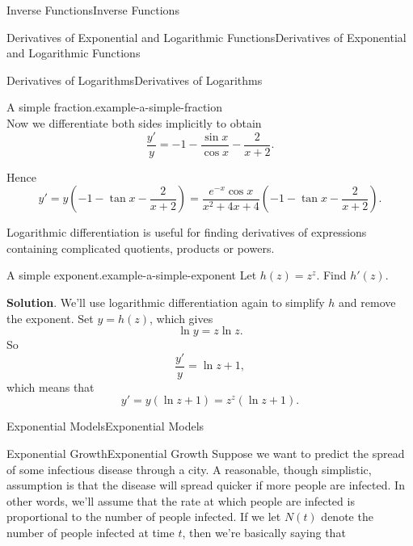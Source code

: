 \documentclass[10pt,]{book}
\numberwithin{equation}{section}
\begin{document}
\begin{chapterptx}{Inverse Functions}{}{Inverse Functions}{}{}
\begin{sectionptx}{Derivatives of Exponential and Logarithmic Functions}{}{Derivatives of Exponential and Logarithmic Functions}{}{}
\begin{subsectionptx}{Derivatives of Logarithms}{}{Derivatives of Logarithms}{}{}
\begin{example}{A simple fraction.}{example-a-simple-fraction}
\begin{equation*}
\end{equation*}
Now we differentiate both sides implicitly to obtain%
\begin{equation*}
\frac{y'}{y} = -1 - \frac{\sin x}{\cos x} - \frac{2}{x+2}.
\end{equation*}
%
\par
\hypertarget{p-242}{}%
Hence%
\begin{equation*}
y' = y\left(-1 - \tan x - \frac{2}{x+2}\right) = \frac{e^{-x}\cos x}{x^{2} + 4x + 4}\left(-1 - \tan x - \frac{2}{x+2}\right).
\end{equation*}
%
\end{example}
\hypertarget{p-243}{}%
Logarithmic differentiation is useful for finding derivatives of expressions containing complicated quotients, products or powers.%
\begin{example}{A simple exponent.}{example-a-simple-exponent}%
\hypertarget{p-244}{}%
Let \(h(z) = z^{z}\). Find \(h'(z)\).%
\par\smallskip%
\noindent\textbf{Solution}.\hypertarget{solution-53}{}\quad%
\hypertarget{p-245}{}%
We'll use logarithmic differentiation again to simplify \(h\) and remove the exponent. Set \(y = h(z)\), which gives%
\begin{equation*}
\ln y = z\ln z.
\end{equation*}
So%
\begin{equation*}
\frac{y'}{y} = \ln z + 1,
\end{equation*}
which means that%
\begin{equation*}
y' = y(\ln z + 1) = z^{z}(\ln z + 1).
\end{equation*}
%
\end{example}
\end{subsectionptx}
\end{sectionptx}
%
%
\typeout{************************************************}
\typeout{************************************************}
%
\begin{sectionptx}{Exponential Models}{}{Exponential Models}{}{}\label{section-exponential-models}
%
%
\typeout{************************************************}
\typeout{************************************************}
%
\begin{subsectionptx}{Exponential Growth}{}{Exponential Growth}{}{}\label{subsection-exponential-growth}
\hypertarget{p-246}{}%
Suppose we want to predict the spread of some infectious disease through a city. A reasonable, though simplistic, assumption is that the disease will spread quicker if more people are infected. In other words, we'll assume that the rate at which people are infected is proportional to the number of people infected. If we let \(N(t)\) denote the number of people infected at time \(t\), then we're basically saying that%

\end{subsectionptx}
\end{sectionptx}
\end{chapterptx}
\end{document}
